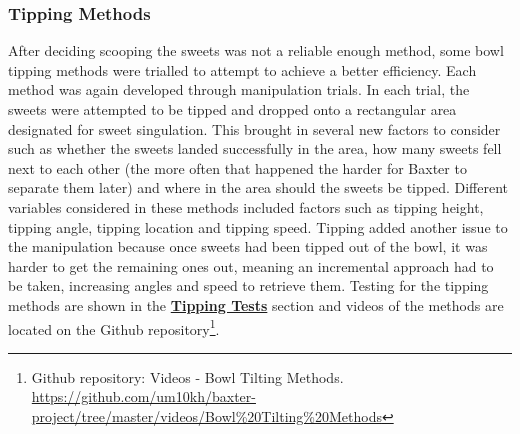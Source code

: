 \subsubsection{Tipping Methods}
\label{sssec:tippingmethods}
After deciding scooping the sweets was not a reliable enough method, some bowl tipping methods were trialled to attempt to achieve a better efficiency. Each method was again developed through manipulation trials. In each trial, the sweets were attempted to be tipped and dropped onto a rectangular area designated for sweet singulation. This brought in several new factors to consider such as whether the sweets landed successfully in the area, how many sweets fell next to each other (the more often that happened the harder for Baxter to separate them later) and where in the area should the sweets be tipped.
\newline\newline
Different variables considered in these methods included factors such as tipping height, tipping angle, tipping location and tipping speed. Tipping added another issue to the manipulation because once sweets had been tipped out of the bowl, it was harder to get the remaining ones out, meaning an incremental approach had to be taken, increasing angles and speed to retrieve them. Testing for the tipping methods are shown in the \hyperref[sssec:TippingTest]{\textbf{Tipping Tests}} section and videos of the methods are located on the Github repository\footnote{Github repository: Videos - Bowl Tilting Methods. \url{https://github.com/um10kh/baxter-project/tree/master/videos/Bowl\%20Tilting\%20Methods}}.
